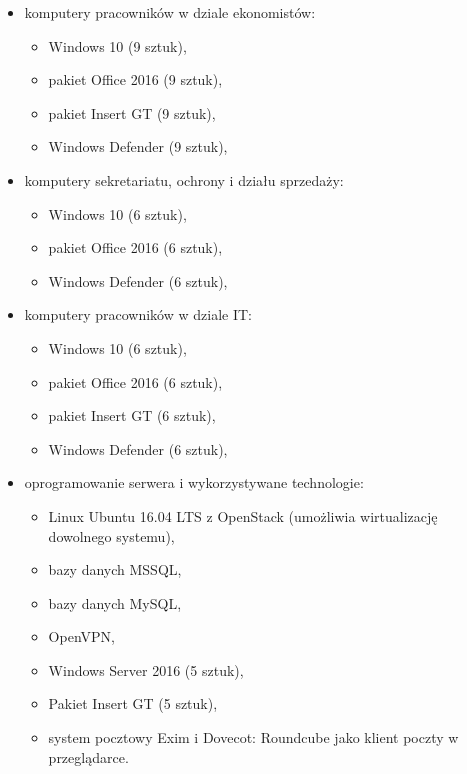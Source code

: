 \hspace{-0.5cm}\begin{minipage}{13.5cm}
\begin{itemize}
	\item komputery pracowników w dziale ekonomistów:
	\begin{itemize}
		\item Windows 10 (9 sztuk),
		\item pakiet Office 2016 (9 sztuk),
		\item pakiet Insert GT (9 sztuk),
		\item Windows Defender (9 sztuk),
	\end{itemize}
	\item komputery sekretariatu, ochrony i działu sprzedaży:
	\begin{itemize}
		\item Windows 10 (6 sztuk),
		\item pakiet Office 2016 (6 sztuk),
		\item Windows Defender (6 sztuk),
	\end{itemize}
	\item komputery pracowników w dziale IT:
	\begin{itemize}
		\item Windows 10 (6 sztuk),
		\item pakiet Office 2016 (6 sztuk),
		\item pakiet Insert GT (6 sztuk),
		\item Windows Defender (6 sztuk),
	\end{itemize}
	\item oprogramowanie serwera i wykorzystywane technologie:
	\begin{itemize}
		\item Linux Ubuntu 16.04 LTS z OpenStack (umożliwia wirtualizację
		\linebreak dowolnego systemu),
		\item bazy danych MSSQL,
		\item bazy danych MySQL,
		\item OpenVPN,
		\item Windows Server 2016 (5 sztuk),
		\item Pakiet Insert GT (5 sztuk),
		\item system pocztowy Exim i Dovecot: Roundcube jako klient poczty \linebreak w przeglądarce.
	\end{itemize}
\end{itemize}
\end{minipage}

